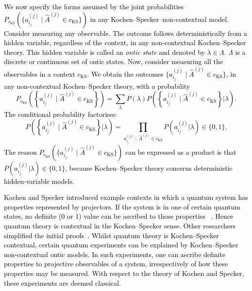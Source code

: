 \documentclass[%
 reprint,
superscriptaddress,
nofootinbib,
bibnotes,
 amsmath,amssymb,
 aps,
]{revtex4-1}
\theoremstyle{plain}
\newcommand{\Dave}[1]{\textcolor{black}{#1} }
\newcommand{\nicole}[1]{\textcolor{black}{#1} }
\begin{document}
\nicole{
We now specify the forms assumed by the joint probabilities $P_{c_{\mathrm{KS}}}\left( \{ a^{(j)}_{i_j} \; | \; \hat{A}^{(j)} \in c_{\mathrm{KS}}  \} \right)$ in any Kochen--Specker--non-contextual  model.
Consider
 measuring any observable.
The outcome follows deterministically from a hidden variable, regardless of the context, in any non-contextual Kochen--Specker theory. This hidden variable is called an \emph{ontic state} and denoted by $\lambda \in \Lambda$.
$\Lambda$ is a discrete or continuous set of ontic states. 
Now, consider measuring all the observables in a context $c_{\mathrm{KS}}$.
We obtain the outcomes \Dave{$ \{ a_{i_j}^{(j)} \; | \; \hat{A}^{(j)} \in c_{\mathrm{KS}}  \}$, in} any non-contextual Kochen--Specker theory, with a probability
\begin{equation}
P_{c_{\mathrm{KS}}}  \left( \left \{ a_{i_j}^{(j)} \; | \; \hat{A}^{(j)} \in c_{\mathrm{KS}}  \right\}  \right) 
= \sum_{\lambda} P(\lambda) P \left( \left\{ a_{i_j}^{(j)} \;   | \; \hat{A}^{(j)} \in c_{\mathrm{KS}}  \right\}  | \lambda \right) .
\end{equation}
The conditional probability factorises:
\begin{equation}
\label{eq_P_lambda} 
P \left( \left\{ a_{i_j}^{(j)} \;   | \; \hat{A}^{(j)} \in c_{\mathrm{KS}}  \right\}  | \lambda \right) = \prod_{ a_{i_j}^{(j)} \; :   \; \hat{A}^{(j)} \in c_{\mathrm{KS}} } P (  a_{i_j}^{(j)}  | \lambda  )  \in \{ 0,1\} .
\end{equation}
\nicole{\Dave{The reason $P_{c_{\mathrm{KS}}}\left( \{ a^{(j)}_{i_j} \; | \; \hat{A}^{(j)} \in c_{\mathrm{KS}}  \} \right)$ can be expressed as a product} is that $P (  a_{i_j}^{(j)}  | \lambda ) \in \{ 0 , 1\}$, because}   Kochen--Specker theory concerns deterministic hidden-variable models. 
}

\nicole{
Kochen and Specker introduced example contexts in which a quantum system has \Dave{properties}  represented by \Dave{projectors.} If the system is in one of certain quantum states, no definite (0 or 1) value can be ascribed to \Dave{those properties~\cite{Kochen68}}. 
Hence quantum theory is contextual in the Kochen--Specker sense. Other researchers simplified the initial proofs~\cite{Peres90, Mermin93, Simon01,Larsson02,Cabello08, Klyachko08}.  \Dave{Whilst quantum theory is Kochen--Specker contextual,  certain quantum experiments can be explained by Kochen--Specker non-contextual ontic models.  In such experiments, one can ascribe definite properties to projective observables of a system, irrespectively of how these properties may be measured.  With respect to the theory of Kochen and Specker, these experiments are deemed classical.}
}
\end{document}
